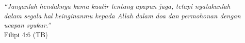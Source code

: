 \clearpage
{}%
\pagestyle{fancy}
\fancyhf{}
\fancyhead[L]{\thepage}

\begin{Center}
	\centering \textit{``Janganlah hendaknya kamu kuatir tentang apapun juga, tetapi nyatakanlah dalam segala hal keinginanmu kepada Allah dalam doa dan permohonan dengan ucapan syukur.''}\\
	Filipi 4:6 (TB)
\end{Center}
 
\clearpage
